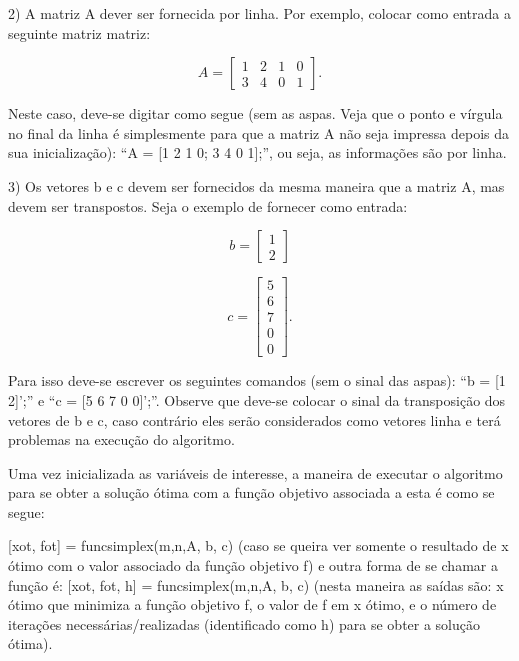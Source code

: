 \documentclass[10pt]{article}
\begin{document}
2) A matriz A dever ser fornecida por linha. Por exemplo, colocar como entrada a seguinte matriz matriz:

\[
A =
  \begin{bmatrix}
    1 & 2 & 1 & 0\\
    3 & 4 & 0 & 1
  \end{bmatrix}.
\]
\newline

Neste caso, deve-se digitar como segue (sem as aspas. Veja que o ponto e vírgula no final da linha é simplesmente para que a matriz A não seja impressa depois da sua inicialização): ``A = [1 2 1 0; 3 4 0 1];'', ou seja, as informações são por linha.
\newline

3) Os vetores b e c devem ser fornecidos da mesma maneira que a matriz A, mas devem ser transpostos. Seja o exemplo de fornecer como entrada:

\[
b = 
  \begin{bmatrix}
	1\\
	2
  \end{bmatrix}
\]

\[
c = 
  \begin{bmatrix}
	5\\
	6\\
	7\\
	0\\
	0
  \end{bmatrix}.
\]

Para isso deve-se escrever os seguintes comandos (sem o sinal das aspas): ``b = [1 2]';'' e ``c = [5 6 7 0 0]';''. Observe que deve-se colocar o sinal da transposição dos vetores de b e c, caso contrário eles serão considerados como vetores linha e terá problemas na execução do algoritmo.
\newline

Uma vez inicializada as variáveis de interesse, a maneira de executar o algoritmo para se obter a solução ótima com a função objetivo associada a esta é como se segue:
\newline

[xot, fot] = funcsimplex(m,n,A, b, c) (caso se queira ver somente o resultado de x ótimo com o valor associado da função objetivo f) e outra forma de se chamar a função é: [xot, fot, h] = funcsimplex(m,n,A, b, c) (nesta maneira as saídas são: x ótimo que minimiza a função objetivo f, o valor de f em x ótimo, e o número de iterações necessárias/realizadas (identificado como h) para se obter a solução ótima).
\newline
\end{document}

